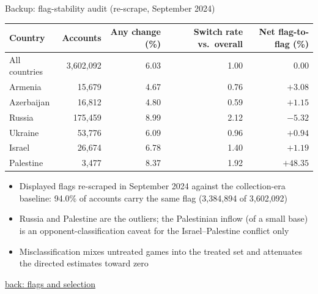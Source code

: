 \documentclass[aspectratio=169,11pt,t]{beamer}
\newcommand{\backto}[2]{\vfill\hfill\hyperlink{#1}{\textcolor{linkblue}{\scriptsize\textsf{back: #2}}}}
\begin{document}
\begin{frame}[label=bk-flags]{Backup: flag-stability audit (re-scrape, September 2024)}
  \centering
  \footnotesize
  \begin{tabular}{@{}lrrrr@{}}
    \toprule
    Country & Accounts & Any change (\%) & Switch rate vs.\ overall & Net flag-to-flag (\%) \\
    \midrule
    All countries & 3,602,092 & 6.03 & 1.00 & 0.00 \\
    Armenia & 15,679 & 4.67 & 0.76 & $+3.08$ \\
    Azerbaijan & 16,812 & 4.80 & 0.59 & $+1.15$ \\
    Russia & 175,459 & 8.99 & 2.12 & $-5.32$ \\
    Ukraine & 53,776 & 6.09 & 0.96 & $+0.94$ \\
    Israel & 26,674 & 6.78 & 1.40 & $+1.19$ \\
    Palestine & 3,477 & 8.37 & 1.92 & $+48.35$ \\
    \bottomrule
  \end{tabular}
  \vspace{2mm}
  \begin{flushleft}\footnotesize
    \begin{itemize}
      \item Displayed flags re-scraped in September 2024 against the collection-era baseline: 94.0\% of accounts carry the same flag (3,384,894 of 3,602,092)
      \item Russia and Palestine are the outliers; the Palestinian inflow (of a small base) is an opponent-classification caveat for the Israel--Palestine conflict only
      \item Misclassification mixes untreated games into the treated set and attenuates the directed estimates toward zero
    \end{itemize}
  \end{flushleft}
  \backto{flags}{flags and selection}
\end{frame}
\end{document}
